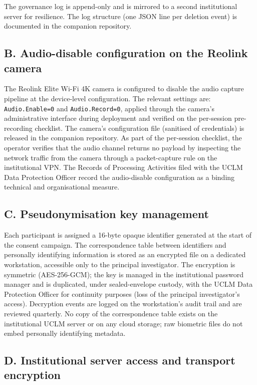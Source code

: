 The governance log is append-only and is mirrored to a second institutional server for resilience. The log structure (one JSON line per deletion event) is documented in the companion repository.

\subsection*{B. Audio-disable configuration on the Reolink camera}

The Reolink Elite Wi-Fi 4K camera is configured to disable the audio capture pipeline at the device-level configuration. The relevant settings are: \texttt{Audio.Enable=0} and \texttt{Audio.Record=0}, applied through the camera's administrative interface during deployment and verified on the per-session pre-recording checklist. The camera's configuration file (sanitised of credentials) is released in the companion repository. As part of the per-session checklist, the operator verifies that the audio channel returns no payload by inspecting the network traffic from the camera through a packet-capture rule on the institutional VPN. The Records of Processing Activities filed with the UCLM Data Protection Officer record the audio-disable configuration as a binding technical and organisational measure.

\subsection*{C. Pseudonymisation key management}

Each participant is assigned a 16-byte opaque identifier generated at the start of the consent campaign. The correspondence table between identifiers and personally identifying information is stored as an encrypted file on a dedicated workstation, accessible only to the principal investigator. The encryption is symmetric (AES-256-GCM); the key is managed in the institutional password manager and is duplicated, under sealed-envelope custody, with the UCLM Data Protection Officer for continuity purposes (loss of the principal investigator's access). Decryption events are logged on the workstation's audit trail and are reviewed quarterly. No copy of the correspondence table exists on the institutional UCLM server or on any cloud storage; raw biometric files do not embed personally identifying metadata.

\subsection*{D. Institutional server access and transport encryption}

